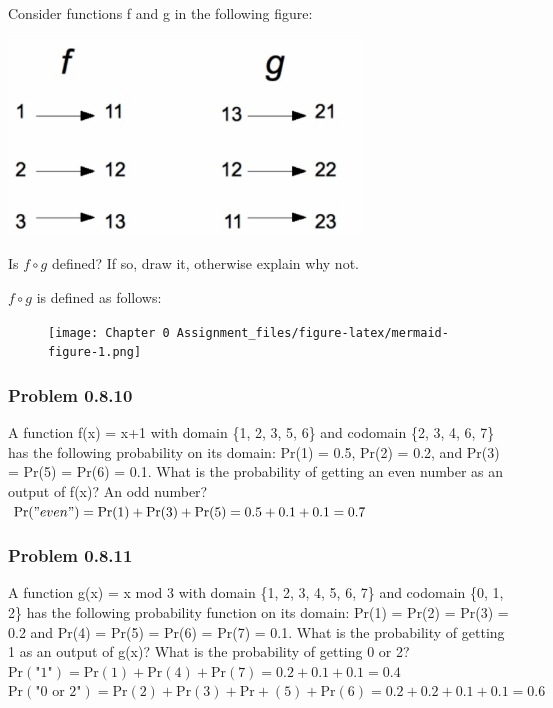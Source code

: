 \documentclass[
  letterpaper,
  DIV=11,
  numbers=noendperiod]{scrartcl}
\begin{document}
Consider functions f and g in the following figure:

\includegraphics[width=3.70833in,height=\textheight]{images/image-1619342838.png}

Is \(f \circ g\) defined? If so, draw it, otherwise explain why not.

\(f \circ g\) is defined as follows:

\begin{figure}[H]

{\centering \texttt{[image: Chapter 0 Assignment\_files/figure-latex/mermaid-figure-1.png]}

}

\end{figure}

\hypertarget{problem-0.8.10}{%
\subsubsection{Problem 0.8.10}\label{problem-0.8.10}}

A function f(x) = x+1 with domain \{1, 2, 3, 5, 6\} and codomain \{2, 3,
4, 6, 7\} has the following probability on its domain: Pr(1) = 0.5,
Pr(2) = 0.2, and Pr(3) = Pr(5) = Pr(6) = 0.1. What is the probability of
getting an even number as an output of f(x)? An odd number?
\(\mathrm{Pr}("even") = \mathrm{Pr}(1) + \mathrm{Pr}(3) + \mathrm{Pr}(5) = 0.5+0.1+0.1 = 0.7\)

\hypertarget{problem-0.8.11}{%
\subsubsection{Problem 0.8.11}\label{problem-0.8.11}}

A function g(x) = x mod 3 with domain \{1, 2, 3, 4, 5, 6, 7\} and
codomain \{0, 1, 2\} has the following probability function on its
domain: Pr(1) = Pr(2) = Pr(3) = 0.2 and Pr(4) = Pr(5) = Pr(6) = Pr(7) =
0.1. What is the probability of getting 1 as an output of g(x)? What is
the probability of getting 0 or 2?
\(\mathrm{Pr}(\text{"1"}) = \mathrm{Pr}(1) + \mathrm{Pr}(4) + \mathrm{Pr}(7) = 0.2 + 0.1 + 0.1 = 0.4\)\\
\(\mathrm{Pr}(\text{"0 or 2"}) = \mathrm{Pr}(2) + \mathrm{Pr}(3)+\mathrm{Pr}+(5)+\mathrm{Pr}(6) = 0.2 + 0.2 + 0.1 + 0.1 = 0.6\)
\end{document}
